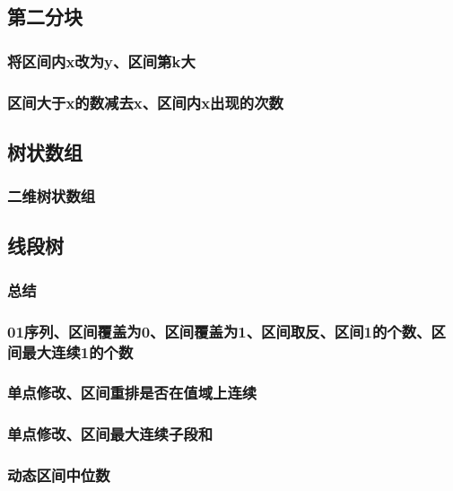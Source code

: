 \documentclass[10pt,a4paper]{article}
\begin{document}
	\subsection{第二分块}
	\subsubsection{将区间内x改为y、区间第k大}
	
	\subsubsection{区间大于x的数减去x、区间内x出现的次数}
	
	\subsection{树状数组}
	\subsubsection{二维树状数组}
	
	\subsection{线段树}
	\subsubsection{总结}
	
	\subsubsection{01序列、区间覆盖为0、区间覆盖为1、区间取反、区间1的个数、区间最大连续1的个数}
	
	\subsubsection{单点修改、区间重排是否在值域上连续}
	
	\subsubsection{单点修改、区间最大连续子段和}
	
	\subsubsection{动态区间中位数}
	
\end{document}
